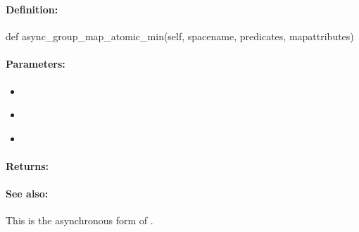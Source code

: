 \pagebreak
\subsubsection{}
\label{api:python:async_group_map_atomic_min}


\paragraph{Definition:}
\begin{pythoncode}
def async_group_map_atomic_min(self, spacename, predicates, mapattributes)
\end{pythoncode}

\paragraph{Parameters:}
\begin{itemize}[noitemsep]
\item {}\\

\item {}\\

\item {}\\

\end{itemize}

\paragraph{Returns:}


\paragraph{See also:}  This is the asynchronous form of .

\pagebreak
\subsubsection{}
\label{api:python:map_atomic_max}


